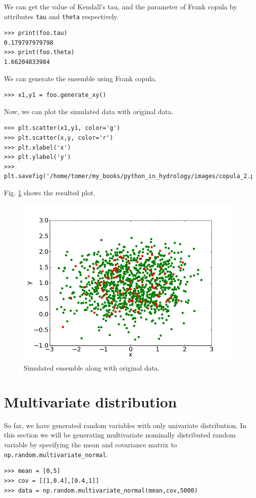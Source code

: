 \documentclass[10pt]{book}
\begin{document}
{We can get the value of Kendall's tau, and the parameter of Frank copula by attributes \verb"tau" and \verb"theta" respectively. 
\beforeverb \begin{verbatim}
>>> print(foo.tau)
0.179797979798
>>> print(foo.theta)
1.66204833984
\end{verbatim} \afterverb

We can generate the ensemble using Frank copula. 
\beforeverb \begin{verbatim}
>>> x1,y1 = foo.generate_xy()
\end{verbatim} \afterverb

Now, we can plot the simulated data with original data.
\beforeverb \begin{verbatim}
>>> plt.scatter(x1,y1, color='g')
>>> plt.scatter(x,y, color='r')
>>> plt.xlabel('x')
>>> plt.ylabel('y')
>>> plt.savefig('/home/tomer/my_books/python_in_hydrology/images/copula_2.png')
\end{verbatim} \afterverb

Fig. \ref{fig:copula2} shows the resulted plot. 
\beforefig
\begin{figure}[h!]
  \centering
    \includegraphics[scale=0.5]{images/copula_2.png}
  \caption{Simulated ensemble along with original data.}
   \label{fig:copula2}
\end{figure}
\afterfig

\section{Multivariate distribution}
So far, we have generated random variables with only univariate distribution. In this section we will be generating multivariate nominally distributed random variable by specifying the mean and covariance matrix to \verb"np.random.multivariate_normal". 
\beforeverb \begin{verbatim}
>>> mean = [0,5]
>>> cov = [[1,0.4],[0.4,1]]
>>> data = np.random.multivariate_normal(mean,cov,5000)
\end{verbatim} \afterverb

}
\end{document}

